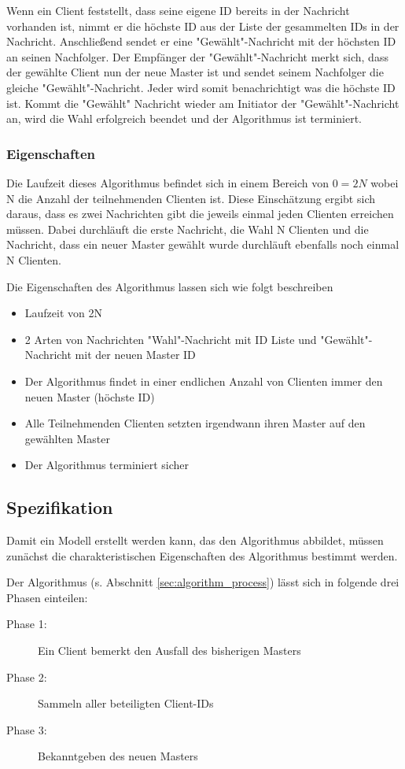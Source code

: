 Wenn ein Client feststellt, dass seine eigene ID bereits in der Nachricht vorhanden ist, nimmt er die höchste ID aus der Liste der gesammelten IDs in der Nachricht. Anschließend sendet er eine "Gewählt"-Nachricht mit der höchsten ID an seinen Nachfolger. Der Empfänger der "Gewählt"-Nachricht merkt sich, dass der gewählte Client nun der neue Master ist und sendet seinem Nachfolger die gleiche "Gewählt"-Nachricht. Jeder wird somit benachrichtigt was die höchste ID ist. Kommt die "Gewählt" Nachricht wieder am Initiator der "Gewählt"-Nachricht an, wird die Wahl erfolgreich beendet und der Algorithmus ist terminiert.

\subsubsection*{Eigenschaften}
Die Laufzeit dieses Algorithmus befindet sich in einem Bereich von $0=2N$ wobei N die Anzahl der teilnehmenden Clienten ist. Diese Einschätzung ergibt sich daraus, dass es zwei Nachrichten gibt die jeweils einmal jeden Clienten erreichen müssen. Dabei durchläuft die erste Nachricht, die Wahl N Clienten und die Nachricht, dass ein neuer Master gewählt wurde durchläuft ebenfalls noch einmal N Clienten.
 
Die Eigenschaften des Algorithmus lassen sich wie folgt beschreiben
 \begin{itemize}
	\item Laufzeit von 2N
	\item 2 Arten von Nachrichten "Wahl"-Nachricht mit ID Liste und "Gewählt"-Nachricht mit der neuen Master ID
	\item Der Algorithmus findet in einer endlichen Anzahl von Clienten immer den neuen Master (höchste ID)
	\item Alle Teilnehmenden Clienten setzten irgendwann ihren Master auf den gewählten Master 
	\item Der Algorithmus terminiert sicher
\end{itemize}

\subsection{Spezifikation}
Damit ein Modell erstellt werden kann, das den Algorithmus abbildet, müssen zunächst die charakteristischen Eigenschaften des Algorithmus bestimmt werden.

Der Algorithmus (s. Abschnitt \ref{sec:algorithm_process}) lässt sich in folgende drei Phasen einteilen:
\begin{description}
\item[Phase 1:] Ein Client bemerkt den Ausfall des bisherigen Masters
\item[Phase 2:] Sammeln aller beteiligten Client-IDs
\item[Phase 3:] Bekanntgeben des neuen Masters
\end{description}

